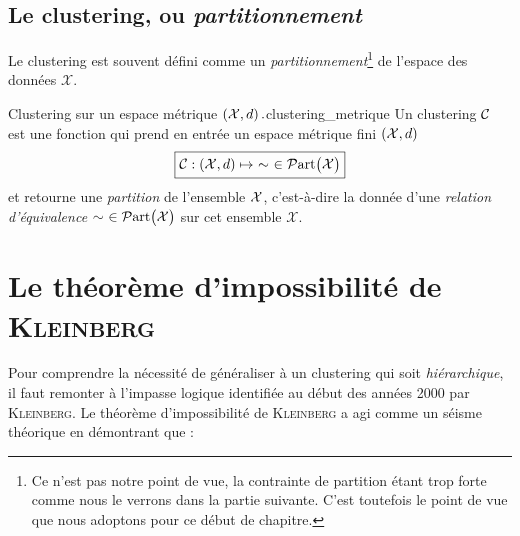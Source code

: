 

\subsection{Le clustering, ou \emph{partitionnement}} 
Le clustering est souvent défini comme un \emph{partitionnement}\footnote{Ce n'est pas notre point de vue, la contrainte de partition étant trop forte comme nous le verrons dans la partie suivante. C'est toutefois le point de vue que nous adoptons pour ce début de chapitre.} de l'espace des données $\mathcal X$.


\begin{Definition}{Clustering sur un espace métrique $\left( \mathcal{X}, d\right).$}{clustering_metrique}
Un clustering $\mathcal{C}$ est une fonction qui prend en entrée un espace métrique fini $\left( \mathcal{X}, d\right)$%
\[
\boxed{
    \mathcal{C} : \left(\mathcal{X}, d \right) \mapsto \ \sim \  \in \mathcal{P}\mathrm{art}\bigl( \mathcal{X} \bigr)
}
\]
et retourne une \emph{partition} de l'ensemble $\mathcal{X}$, c'est-à-dire la donnée d'une \emph{relation d'équivalence $\sim \ \in \mathcal{P}\mathrm{art}\bigl( \mathcal{X} \bigr)$} sur cet ensemble $\mathcal X$. 
\end{Definition}



\section{Le théorème d'impossibilité de \textsc{Kleinberg}}
\label{sec:Kleinberg}
Pour comprendre la nécessité de généraliser à un clustering qui soit \emph{hiérarchique}, il faut remonter à l'impasse logique identifiée au début des années 2000 par \textsc{Kleinberg}. Le théorème d'impossibilité de \textsc{Kleinberg} \cite{Kleinberg2002} a agi comme un séisme théorique en démontrant que :


